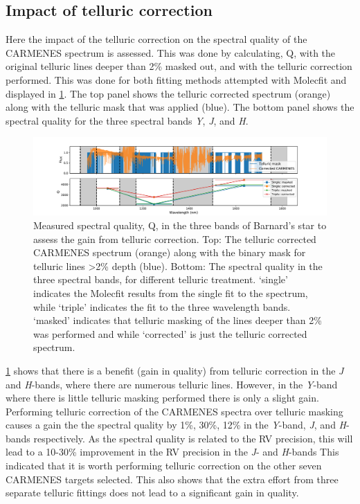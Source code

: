 \subsection{Impact of telluric correction}
\label{subsec:impact_telluric_correction}
Here the impact of the telluric correction on the spectral quality of the CARMENES spectrum is assessed.
This was done by calculating, Q, with the original telluric lines deeper than 2\% masked out, and with the telluric correction performed.
This was done for both fitting methods attempted with Molecfit and displayed in \cref{fig:band_qualityfromapplyingtelluriccorrection}.
The top panel shows the telluric corrected spectrum (orange) along with the telluric mask that was applied (blue).
The bottom panel shows the spectral quality for the three spectral bands \emph{Y}, \emph{J}, and \emph{H}.

\begin{figure}
    \centering
    \includegraphics[width=0.7\linewidth]{figures/information-content/Carmenes/Band_quality_from_applying_telluric_correction}
    \caption[Barnard's star spectral quality.]{Measured spectral quality, Q, in the three \nir{} bands of Barnard's star to assess the gain from telluric correction. 
        Top: The telluric corrected CARMENES spectrum (orange) along with the binary mask for telluric lines >2\% depth (blue). 
        Bottom: The spectral quality in the three spectral bands, for different telluric treatment. `single' indicates the Molecfit results from the single fit to the spectrum, while `triple' indicates the fit to the three wavelength bands.
        `masked' indicates that telluric masking of the lines deeper than 2\% was performed and while `corrected' is just the telluric corrected spectrum.}
    \label{fig:band_qualityfromapplyingtelluriccorrection}
\end{figure}

\cref{fig:band_qualityfromapplyingtelluriccorrection} shows that there is a benefit (gain in quality) from telluric correction in the \emph{J} and \emph{H}-bands, where there are numerous telluric lines.
However, in the \emph{Y}-band where there is little telluric masking performed there is only a slight gain.
Performing telluric correction of the CARMENES spectra over telluric masking causes a gain the the spectral quality by 1\%, 30\%, 12\% in the \emph{Y}-band, \emph{J}, and \emph{H}-bands respectively.
As the spectral quality is related to the RV precision, this will lead to a 10-30\% improvement in the RV precision in the \emph{J}- and \emph{H}-bands
This indicated that it is worth performing telluric correction on the other seven {CARMENES} targets selected.
This also shows that the extra effort from three separate telluric fittings does not lead to a significant gain in quality.


